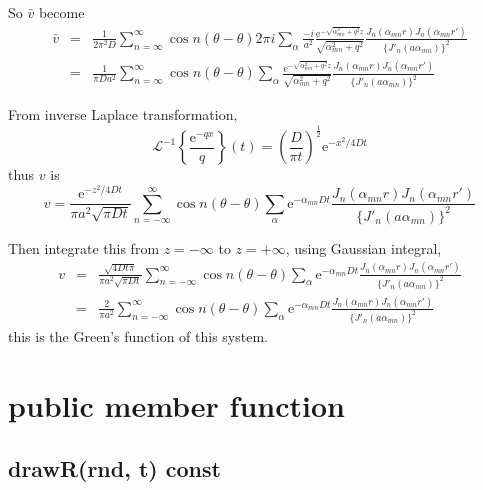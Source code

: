 \documentclass{article}
\begin{document}
So $\bar{v}$ become
\begin{eqnarray}
\bar{v} &=& \frac{1}{2\pi^2D}\sum^\infty_{n = \infty}\cos n(\theta - \theta)
            2\pi i\sum_\alpha
            \frac{-i}{a^2}\frac{\mathrm{e}^{-\sqrt{\alpha_{mn}^2 + q^2} z}}
                     {\sqrt{\alpha_{mn}^2+q^2}}
            \frac{J_n(\alpha_{mn}r)J_n(\alpha_{mn}r')}{\{J'_n(a\alpha_{mn})\}^2} \nonumber \\
        &=& \frac{1}{\pi Da^2}\sum^\infty_{n = \infty}\cos n(\theta - \theta)
            \sum_\alpha
            \frac{\mathrm{e}^{-\sqrt{\alpha_{mn}^2 + q^2} z}}
                 {\sqrt{\alpha_{mn}^2+q^2}}
            \frac{J_n(\alpha_{mn}r)J_n(\alpha_{mn}r')}{\{J'_n(a\alpha_{mn})\}^2}
\end{eqnarray}

From inverse Laplace transformation,
\begin{equation}
    \mathscr{L}^{-1} \left\{\frac{\mathrm{e}^{-qx}}{q}\right\}(t)
  = \left(\frac{D}{\pi t}\right)^\frac{1}{2} \mathrm{e}^{-x^2/4Dt}
\end{equation}
thus $v$ is
\begin{equation}
    v = \frac{\mathrm{e}^{-z^2/4Dt}}{\pi a^2\sqrt{\pi Dt}}
        \sum^\infty_{n = -\infty}\cos n(\theta - \theta)
        \sum_\alpha
        \mathrm{e}^{-\alpha_{mn}Dt}
        \frac{J_n(\alpha_{mn}r)J_n(\alpha_{mn}r')}{\{J'_n(a\alpha_{mn})\}^2}
\end{equation}

Then integrate this from $z = -\infty$ to $z = + \infty$, using Gaussian integral, 
\begin{eqnarray}
    v &=& \frac{\sqrt{4Dt\pi}}{\pi a^2\sqrt{\pi Dt}}
          \sum^\infty_{n = -\infty}\cos n(\theta - \theta)
          \sum_\alpha
          \mathrm{e}^{-\alpha_{mn}Dt}
          \frac{J_n(\alpha_{mn}r)J_n(\alpha_{mn}r')}{\{J'_n(a\alpha_{mn})\}^2} \nonumber\\
      &=& \frac{2}{\pi a^2}
          \sum^\infty_{n = -\infty}\cos n(\theta - \theta)
          \sum_\alpha
          \mathrm{e}^{-\alpha_{mn}Dt}
          \frac{J_n(\alpha_{mn}r)J_n(\alpha_{mn}r')}{\{J'_n(a\alpha_{mn})\}^2}
\end{eqnarray}
this is the Green's function of this system.

\section{public member function}

\subsection{drawR(rnd, t) const}
\end{document}
